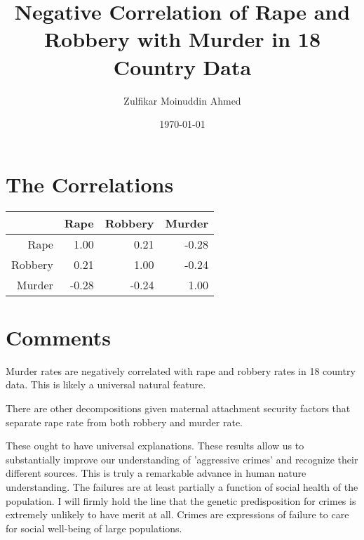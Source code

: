 \documentclass{amsart}
\title{Negative Correlation of Rape and Robbery with Murder in 18 Country Data}
\author{Zulfikar Moinuddin Ahmed}
\date{\today}
\begin{document}
\maketitle

\section{The Correlations}

\begin{table}[ht]
\centering
\begin{tabular}{rrrr}
  \hline
 & Rape & Robbery & Murder \\ 
  \hline
Rape & 1.00 & 0.21 & -0.28 \\ 
  Robbery & 0.21 & 1.00 & -0.24 \\ 
  Murder & -0.28 & -0.24 & 1.00 \\ 
   \hline
\end{tabular}
\end{table}

\section{Comments}
Murder rates are negatively correlated with rape and robbery rates in 18 country data.  This is likely a universal natural feature.  

There are other decompositions given  maternal attachment security factors that separate rape rate from both robbery and murder rate.

These ought to have universal explanations.  These results allow us to substantially improve our understanding of 'aggressive crimes' and recognize their different sources.  This is truly a remarkable advance in human nature understanding.  The failures are at least partially a function of social health of the population.  I will firmly hold the line that the genetic predisposition for crimes is extremely unlikely to have merit at all.  Crimes are expressions of failure to care for social well-being of large populations.
\end{document}
